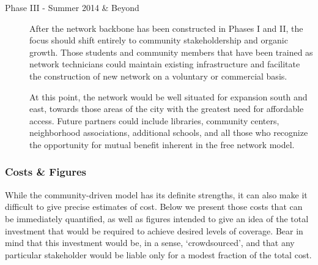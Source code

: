 \begin{description}
\item[Phase III - Summer 2014 \& Beyond]
After the network backbone has been constructed in Phases I and II, the
focus should shift entirely to community stakeholdership and organic growth.
Those students and community members that have been trained as network
technicians could maintain existing infrastructure and facilitate the
construction of new network on a voluntary or commercial basis. \par
At this point, the network would be well situated for expansion south and east,
towards those areas of the city with the greatest need for affordable access.
Future partners could include libraries, community centers, neighborhood
associations, additional schools, and all those who recognize the opportunity
for mutual benefit inherent in the free network model.\par
\end{description}

\subsubsection{Costs \& Figures}
While the community-driven model has its definite strengths, it can also make it
difficult to give precise estimates of cost. Below we present
those costs that can be immediately quantified, as well as figures intended to
give an idea of the total investment that would be required to achieve desired
levels of coverage. Bear in mind that this investment would be, in a sense,
`crowdsourced', and that any particular stakeholder would be liable only for a
modest fraction of the total cost. \par

